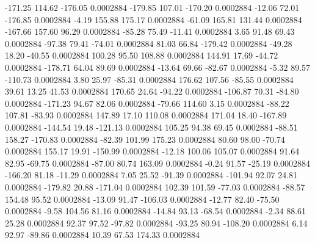      -171.25      114.62     -176.05     0.0002884
     -179.85      107.01     -170.20     0.0002884
      -12.06       72.01     -176.85     0.0002884
       -4.19      155.88      175.17     0.0002884
      -61.09      165.81      131.44     0.0002884
     -167.66      157.60       96.29     0.0002884
      -85.28       75.49      -11.41     0.0002884
        3.65       91.48       69.43     0.0002884
      -97.38       79.41      -74.01     0.0002884
       81.03       66.84     -179.42     0.0002884
      -49.28       18.20      -40.55     0.0002884
      100.28       95.50      108.88     0.0002884
      144.91       17.69      -44.72     0.0002884
     -178.71       64.04       89.69     0.0002884
      -13.64       69.66      -82.67     0.0002884
       -5.32       89.57     -110.73     0.0002884
        3.80       25.97      -85.31     0.0002884
      176.62      107.56      -85.55     0.0002884
       39.61       13.25       41.53     0.0002884
      170.65       24.64      -94.22     0.0002884
     -106.87       70.31      -84.80     0.0002884
     -171.23       94.67       82.06     0.0002884
      -79.66      114.60        3.15     0.0002884
      -88.22      107.81      -83.93     0.0002884
      147.89       17.10      110.08     0.0002884
      171.04       18.40     -167.89     0.0002884
     -144.54       19.48     -121.13     0.0002884
      105.25       94.38       69.45     0.0002884
      -88.51      158.27     -170.83     0.0002884
      -82.39      101.99      175.23     0.0002884
       80.60       98.00      -70.74     0.0002884
      155.17       19.91     -150.99     0.0002884
      -12.18      100.06      105.07     0.0002884
       91.64       82.95      -69.75     0.0002884
      -87.00       80.74      163.09     0.0002884
       -0.24       91.57      -25.19     0.0002884
     -166.20       81.18      -11.29     0.0002884
        7.05       25.52      -91.39     0.0002884
     -101.94       92.07       24.81     0.0002884
     -179.82       20.88     -171.04     0.0002884
      102.39      101.59      -77.03     0.0002884
      -88.57      154.48       95.52     0.0002884
      -13.09       91.47     -106.03     0.0002884
      -12.77       82.40      -75.50     0.0002884
       -9.58      104.56       81.16     0.0002884
      -14.84       93.13      -68.54     0.0002884
       -2.34       88.61       25.28     0.0002884
       92.37       97.52      -97.82     0.0002884
      -93.25       80.94     -108.20     0.0002884
        6.14       92.97      -89.86     0.0002884
       10.39       67.53      174.33     0.0002884
